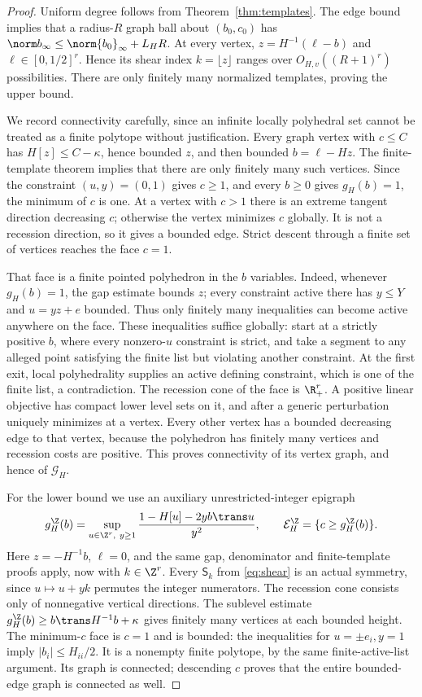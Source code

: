 \begin{proof}
Uniform degree follows from Theorem~\ref{thm:templates}. The edge bound implies that a radius-$R$ graph ball about $(b_0,c_0)$ has
$\norm b_\infty\le\norm{b_0}_\infty+L_HR$.
At every vertex, $z=H^{-1}(\ell-b)$ and $\ell\in[0,1/2]^r$. Hence its shear index $k=\lfloor z\rfloor$ ranges over $O_{H,v}((R+1)^r)$ possibilities. There are only finitely many normalized templates, proving the upper bound.

We record connectivity carefully, since an infinite locally polyhedral set cannot be treated as a finite polytope without justification. Every graph vertex with $c\le C$ has $H[z]\le C-\kappa$, hence bounded $z$, and then bounded $b=\ell-Hz$. The finite-template theorem implies that there are only finitely many such vertices. Since the constraint $(u,y)=(0,1)$ gives $c\ge1$, and every $b\ge0$ gives $g_H(b)=1$, the minimum of $c$ is one. At a vertex with $c>1$ there is an extreme tangent direction decreasing $c$; otherwise the vertex minimizes $c$ globally. It is not a recession direction, so it gives a bounded edge. Strict descent through a finite set of vertices reaches the face $c=1$.

That face is a finite pointed polyhedron in the $b$ variables. Indeed, whenever $g_H(b)=1$, the gap estimate bounds $z$; every constraint active there has $y\le Y$ and $u=yz+e$ bounded. Thus only finitely many inequalities can become active anywhere on the face. These inequalities suffice globally: start at a strictly positive $b$, where every nonzero-$u$ constraint is strict, and take a segment to any alleged point satisfying the finite list but violating another constraint. At the first exit, local polyhedrality supplies an active defining constraint, which is one of the finite list, a contradiction. The recession cone of the face is $\R_+^r$. A positive linear objective has compact lower level sets on it, and after a generic perturbation uniquely minimizes at a vertex. Every other vertex has a bounded decreasing edge to that vertex, because the polyhedron has finitely many vertices and recession costs are positive. This proves connectivity of its vertex graph, and hence of $\mathscr G_H$.

For the lower bound we use an auxiliary unrestricted-integer epigraph
\[
 g_H^{\Z}(b)=\sup_{u\in\Z^r,\ y\ge1}\frac{1-H[u]-2yb\trans u}{y^2},
 \qquad \mathcal E_H^{\Z}=\{c\ge g_H^{\Z}(b)\}.
\]
Here $z=-H^{-1}b$, $\ell=0$, and the same gap, denominator and finite-template proofs apply, now with $k\in\Z^r$. Every $\mathsf S_k$ from \eqref{eq:shear} is an actual symmetry, since $u\mapsto u+yk$ permutes the integer numerators. The recession cone consists only of nonnegative vertical directions. The sublevel estimate
$g_H^{\Z}(b)\ge b\trans H^{-1}b+\kappa$ gives finitely many vertices at each bounded height. The minimum-$c$ face is $c=1$ and is bounded: the inequalities for $u=\pm e_i,y=1$ imply $|b_i|\le H_{ii}/2$. It is a nonempty finite polytope, by the same finite-active-list argument. Its graph is connected; descending $c$ proves that the entire bounded-edge graph is connected as well.


\end{proof}
